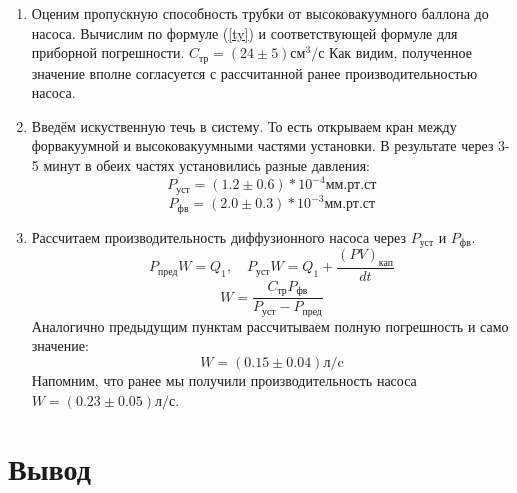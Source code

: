 \documentclass[a4paper,12pt]{article}
\begin{document}
\begin{enumerate}
    \item Оценим пропускную способность трубки от высоковакуумного баллона до насоса.
        Вычислим по формуле (\ref{ty}) и соответствующей формуле для приборной погрешности.
        $C_{\text{тр}} = (24 \pm 5) \text{см}^3/\text{с}$
        Как видим, полученное значение вполне согласуется с рассчитанной ранее производительностью насоса.
    \item Введём искуственную течь в систему.
        То есть открываем кран между форвакуумной и высоковакуумными частями установки.
        В результате через 3-5 минут в обеих частях установились разные давления:
        $$    P_{\text{уст}} = (1.2 \pm 0.6)*10^{-4} \text{мм.рт.ст}$$
        $$    P_{\text{фв}}  = (2.0 \pm 0.3)*10^{-3} \text{мм.рт.ст} $$
    \item Рассчитаем производительность диффузионного насоса через $P_{уст}$ и $P_{фв}$.
	    $$P_{\text{пред}}W = Q_1, \quad P_{\text{уст}}W = Q_1 + \frac{(PV)_{\text{кап}}}{dt}$$
        $$W = \frac{C_{\text{тр}} P_{\text{фв}}}{ P_{\text{уст}} - P_{\text{пред}}}$$
        Аналогично предыдущим пунктам рассчитываем полную погрешность и само значение:
        $$W = (0.15 \pm 0.04) \text{л/c}$$
       Напомним, что ранее мы получили производительность насоса $W = (0.23 \pm 0.05) \text{л/с}$.
    \end{enumerate}

\section{Вывод}
\end{document}
